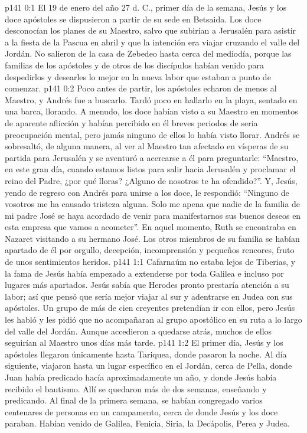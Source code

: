 \author{Comisión de seres intermedios}
\vs p141 0:1 El 19 de enero del año 27 d. C., primer día de la semana, Jesús y los doce apóstoles se dispusieron a partir de su sede en Betsaida. Los doce desconocían los planes de su Maestro, salvo que subirían a Jerusalén para asistir a la fiesta de la Pascua en abril y que la intención era viajar cruzando el valle del Jordán. No salieron de la casa de Zebedeo hasta cerca del mediodía, porque las familias de los apóstoles y de otros de los discípulos habían venido para despedirlos y desearles lo mejor en la nueva labor que estaban a punto de comenzar.
\vs p141 0:2 Poco antes de partir, los apóstoles echaron de menos al Maestro, y Andrés fue a buscarlo. Tardó poco en hallarlo en la playa, sentado en una barca, llorando. A menudo, los doce habían visto a su Maestro en momentos de aparente aflicción y habían percibido en él breves periodos de seria preocupación mental, pero jamás ninguno de ellos lo había visto llorar. Andrés se sobresaltó, de alguna manera, al ver al Maestro tan afectado en vísperas de su partida para Jerusalén y se aventuró a acercarse a él para preguntarle: “Maestro, en este gran día, cuando estamos listos para salir hacia Jerusalén y proclamar el reino del Padre, ¿por qué lloras? ¿Alguno de nosotros te ha ofendido?”. Y, Jesús, yendo de regreso con Andrés para unirse a los doce, le respondió: “Ninguno de vosotros me ha causado tristeza alguna. Solo me apena que nadie de la familia de mi padre José se haya acordado de venir para manifestarnos sus buenos deseos en esta empresa que vamos a acometer”. En aquel momento, Ruth se encontraba en Nazaret visitando a su hermano José. Los otros miembros de su familia se habían apartado de él por orgullo, decepción, incomprensión y pequeños rencores, fruto de unos sentimientos heridos.
\vs p141 1:1 Cafarnaúm no estaba lejos de Tiberias, y la fama de Jesús había empezado a extenderse por toda Galilea e incluso por lugares más apartados. Jesús sabía que Herodes pronto prestaría atención a su labor; así que pensó que sería mejor viajar al sur y adentrarse en Judea con sus apóstoles. Un grupo de más de cien creyentes pretendían ir con ellos, pero Jesús les habló y les pidió que no acompañaran al grupo apostólico en su ruta a lo largo del valle del Jordán. Aunque accedieron a quedarse atrás, muchos de ellos seguirían al Maestro unos días más tarde.
\vs p141 1:2 El primer día, Jesús y los apóstoles llegaron únicamente hasta Tariquea, donde pasaron la noche. Al día siguiente, viajaron hasta un lugar específico en el Jordán, cerca de Pella, donde Juan había predicado hacía aproximadamente un año, y donde Jesús había recibido el bautismo. Allí se quedaron más de dos semanas, enseñando y predicando. Al final de la primera semana, se habían congregado varios centenares de personas en un campamento, cerca de donde Jesús y los doce paraban. Habían venido de Galilea, Fenicia, Siria, la Decápolis, Perea y Judea.
